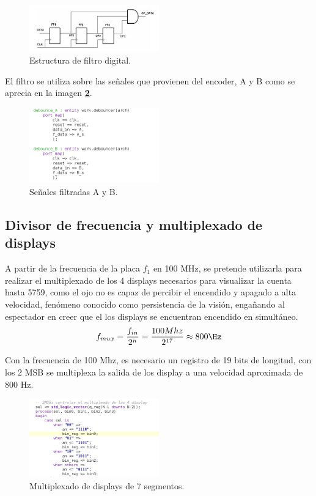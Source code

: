 \documentclass[11pt, a4paper]{article}
\begin{document}
	\begin{figure}[H]
		\centering
		\includegraphics[width=0.5\textwidth]{Imagenes/debouncer.png}
		\caption{Estructura de filtro digital.}
		\label{fig:debouncer}
	\end{figure} 

	El filtro se utiliza sobre las señales que provienen del encoder, A y B como se aprecia en la imagen \textcolor{blue}{\textbf{\ref{fig:A_B}}}.

	\begin{figure}[H]
		\centering
		\includegraphics[width=0.5\textwidth]{Imagenes/A_B.png}
		\caption{Señales filtradas A y B.}
		\label{fig:A_B}
	\end{figure} 


		\subsection{Divisor de frecuencia y multiplexado de displays}
			A partir de la frecuencia de la placa $f_1$ en 100 MHz, se pretende utilizarla para realizar el multiplexado de los 4 displays necesarios para visualizar la cuenta hasta 5759, como el ojo no es capaz de percibir el encendido y apagado a alta velocidad, fenómeno conocido como persistencia de la visión, engañando al espectador en creer que el los displays se encuentran encendido en simultáneo.
		\begin{equation}
			f_{mux} = \frac{f_{in}}{2^n} = \frac{100Mhz}{2^{17}} \approx 800 \Hz
		\end{equation}

			Con la frecuencia de 100 Mhz, es necesario un registro de 19 bits de longitud, con los 2 MSB se multiplexa la salida de los display a una velocidad aproximada de 800 Hz.
		\begin{figure}[H]
			\centering
			\includegraphics[width=0.5\textwidth]{Imagenes/mux.png}
			\caption{Multiplexado de displays de 7 segmentos.}
			\label{fig:mux}
		\end{figure} 
		
\end{document}
